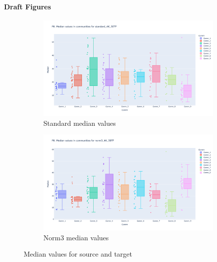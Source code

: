 \paragraph{Draft Figures}

\begin{figure}[H]
    \captionsetup[subfigure]{justification=Centering}
    \begin{subfigure}[t]{0.5\textwidth}
        \includegraphics[width=\textwidth]{Images/P0/standard_4K_50TF_median.png}
        \caption{Standard median values}
    \end{subfigure}\hspace{\fill} %
    \bigskip %
    \begin{subfigure}[t]{0.5\textwidth}
        \includegraphics[width=\linewidth]{Images/P0/norm3_4K_50TF_median.png}
        \caption{Norm3 median values}
    \end{subfigure}\hspace{\fill} %
    \caption{Median values for source and target}
    \label{fig:N_I:P0_median}
\end{figure}


